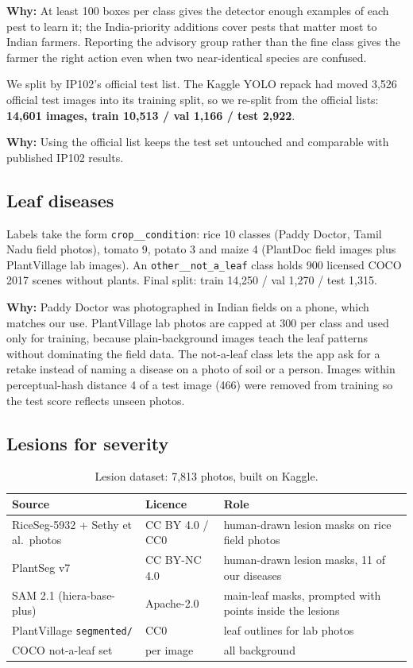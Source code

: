 \documentclass[11pt,a4paper]{article}
\newcommand{\why}[1]{\par\smallskip\noindent\colorbox{leaflight}{\parbox{\dimexpr\linewidth-2\fboxsep}{\small\textbf{\color{leaf}Why:} #1}}\par\smallskip}
\begin{document}
\why{At least 100 boxes per class gives the detector enough examples of each pest to learn it; the India-priority
additions cover pests that matter most to Indian farmers. Reporting the advisory group rather than the fine class gives the farmer the right action
even when two near-identical species are confused.}

We split by IP102's official test list. The Kaggle YOLO repack had moved 3,526 official test images into its training
split, so we re-split from the official lists: \textbf{14,601 images, train 10,513 / val 1,166 / test 2,922}.

\why{Using the official list keeps the test set untouched and comparable with published IP102 results.}

\subsection{Leaf diseases}
Labels take the form \texttt{crop\_\_condition}: rice 10 classes (Paddy Doctor, Tamil Nadu field photos), tomato 9,
potato 3 and maize 4 (PlantDoc field images plus PlantVillage lab images). An \texttt{other\_\_not\_a\_leaf} class holds
900 licensed COCO 2017 scenes without plants. Final split: train 14,250 / val 1,270 / test 1,315.

\why{Paddy Doctor was photographed in Indian fields on a phone, which matches our use. PlantVillage lab photos
are capped at 300 per class and used only for training, because plain-background images teach the leaf patterns
without dominating the field data. The not-a-leaf class lets the app ask for a retake instead of naming a disease on
a photo of soil or a person. Images within perceptual-hash distance 4 of a test image (466) were removed from training
so the test score reflects unseen photos.}

\subsection{Lesions for severity}
\begin{table}[h]
\centering\small
\begin{tabularx}{\linewidth}{@{}p{4.2cm}p{3.4cm}L@{}}
\toprule
\textbf{Source} & \textbf{Licence} & \textbf{Role} \\
\midrule
RiceSeg-5932 + Sethy et al.\ photos & CC BY 4.0 / CC0 & human-drawn lesion masks on rice field photos \\
PlantSeg v7 & CC BY-NC 4.0 & human-drawn lesion masks, 11 of our diseases \\
SAM 2.1 (hiera-base-plus) & Apache-2.0 & main-leaf masks, prompted with points inside the lesions \\
PlantVillage \texttt{segmented/} & CC0 & leaf outlines for lab photos \\
COCO not-a-leaf set & per image & all background \\
\bottomrule
\end{tabularx}
\caption{Lesion dataset: 7,813 photos, built on Kaggle.}
\end{table}
\end{document}
